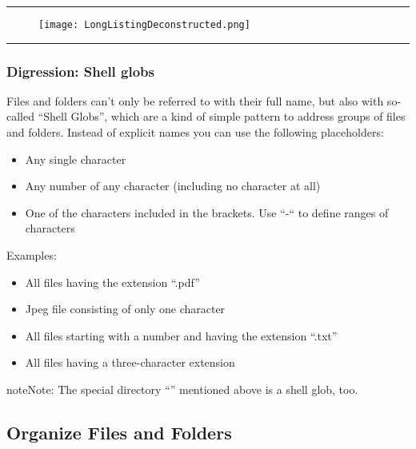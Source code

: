 \documentclass[a4paper,11pt,english]{sphinxmanual}
\begin{document}
\bigskip\hrule{}\bigskip

\begin{figure}[htbp]
\centering

\texttt{[image: LongListingDeconstructed.png]}
\end{figure}


\bigskip\hrule{}\bigskip



\subsubsection{Digression: Shell globs}
\label{introduction:digression-shell-globs}
Files and folders can’t only be referred to with their full name, but also with so-called “Shell Globs”, which are a kind of simple pattern to address groups of files and folders.  Instead of explicit names you can use the following placeholders:
\begin{itemize}
\item {} 
  Any single character

\item {} 
\code{*:}  Any number of any character (including no character at all)

\item {} 
\code{{[}...{]}:}    One of the characters included in the brackets.  Use “-“ to define ranges  of characters

\end{itemize}

Examples:
\begin{itemize}
\item {} 
  All files having the extension “.pdf”

\item {} 
  Jpeg file consisting of only one character

\item {} 
 All files starting with a number and having the extension “.txt”

\item {} 
  All files having a three-character extension

\end{itemize}

\begin{notice}{note}{Note:}
The special directory “\code{\textasciitilde{}}” mentioned above is a shell glob, too.
\end{notice}


\subsection{Organize Files and Folders}
\label{introduction:organize-files-and-folders}
\end{document}
